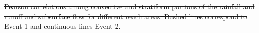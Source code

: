 \documentclass[hess, manuscript]{copernicus}
\providecommand{\DIFdel}[1]{{\protect\color{red}\sout{#1}}}                      %
\providecommand{\DIFdelbegin}{} %
\providecommand{\DIFdelend}{} %
\providecommand{\DIFdelFL}[1]{\DIFdel{#1}} %
\begin{document}
\DIFdelbegin %
{%
\DIFdelFL{Pearson correlations among convective and stratiform portions of the rainfall and runoff and subsurface flow for different reach areas. Dashed lines correspond to Event 1 and continuous lines Event 2.}}
\DIFdelend %
\end{document}
